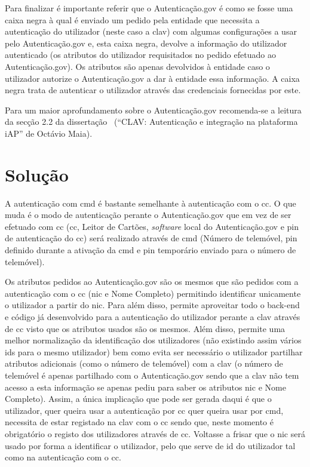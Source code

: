 Para finalizar é importante referir que o Autenticação.gov é como se fosse uma caixa negra à qual é enviado um 
pedido pela entidade que necessita a autenticação do utilizador (neste caso a \acrshort{clav}) com algumas 
configurações a usar pelo Autenticação.gov e, esta caixa negra, devolve a informação do utilizador autenticado 
(os atributos do utilizador requisitados no pedido efetuado ao Autenticação.gov). Os atributos são apenas 
devolvidos à entidade caso o utilizador autorize o Autenticação.gov a dar à entidade essa informação. 
A caixa negra trata de autenticar o utilizador através das credenciais fornecidas por este.

Para um maior aprofundamento sobre o Autenticação.gov recomenda-se a leitura da secção 2.2 da 
dissertação~\cite{otavioTese} (``CLAV: Autenticação e integração na plataforma iAP'' de Octávio Maia).

\section{Solução}

A autenticação com \acrshort{cmd} é bastante semelhante à autenticação com o \acrshort{cc}. O que muda é o modo de autenticação perante o Autenticação.gov que em vez de ser efetuado com \acrshort{cc} (\acrlong{cc}, Leitor de Cartões, \textit{software} local do Autenticação.gov e \acrshort{pin} de autenticação do \acrshort{cc}) será realizado através de \acrshort{cmd} (Número de telemóvel, \acrshort{pin} definido durante a ativação da \acrshort{cmd} e \acrshort{pin} temporário enviado para o número de telemóvel).

Os atributos pedidos ao Autenticação.gov são os mesmos que são pedidos com a autenticação com o \acrshort{cc} (\acrshort{nic} e Nome Completo) permitindo identificar unicamente o utilizador a partir do \acrshort{nic}. Para além disso, permite aproveitar todo o back-end e código já desenvolvido para a autenticação do utilizador perante a \acrshort{clav} através de \acrshort{cc} visto que os atributos usados são os mesmos. Além disso, permite uma melhor normalização da identificação dos utilizadores (não existindo assim vários ids para o mesmo utilizador) bem como evita ser necessário o utilizador partilhar atributos adicionais (como o número de telemóvel) com a \acrshort{clav} (o número de telemóvel é apenas partilhado com o Autenticação.gov sendo que a \acrshort{clav} não tem acesso a esta informação se apenas pediu para saber os atributos \acrshort{nic} e Nome Completo). Assim, a única implicação que pode ser gerada daqui é que o utilizador, quer queira usar a autenticação por \acrshort{cc} quer queira usar por \acrshort{cmd}, necessita de estar registado na \acrshort{clav} com o \acrshort{cc} sendo que, neste momento é obrigatório o registo dos utilizadores através de \acrshort{cc}. Voltasse a frisar que o \acrshort{nic} será usado por forma a identificar o utilizador, pelo que serve de id do utilizador tal como na autenticação com o \acrshort{cc}.

